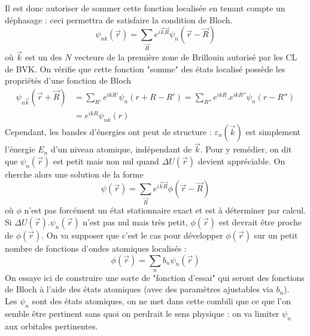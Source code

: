 Il est donc autoriser de sommer cette fonction localisée en tenant compte un 
déphasage : ceci permettra de satisfaire la condition de Bloch. 
\begin{equation}
\psi_{nk}(\vec{r}) = \sum_{\vec{R}} e^{i\vec{k}\vec{R}}\psi_n(\vec{r}-\vec{R})
\end{equation}
où $\vec{k}$ est un des $N$ vecteurs de la première zone de Brillouin autorisé 
par les CL de BVK. On vérifie que cette fonction "somme" des états localisé 
possède les propriétés d'une fonction de  Bloch
\begin{equation}
\begin{array}{ll}
\psi_{n\vec{k}}(\vec{r}+\vec{R}) &= \sum_{R'} e^{ikR'}\psi_n(r+R-R') = \sum_{R''} 
e^{ikR}.e^{ikR''}\psi_n(r-R'')\\
&= e^{ikR}\psi_{nk}(r)
\end{array}
\end{equation}
Cependant, les bandes d'énergies ont peut de structure : $\varepsilon_n(\vec{k})$ 
est simplement l'énergie $E_n$ d'un niveau atomique, indépendant de $\vec{k}$. Pour 
y remédier, on dit que $\psi_n(\vec{r})$ est petit mais non nul quand $\Delta 
U(\vec{r})$ devient appréciable. On cherche alors une solution de la forme
\begin{equation}
\psi(\vec{r}) = \sum_{\vec{R}} e^{i\vec{k}\vec{R}}\phi(\vec{r}-\vec{R})
\end{equation}
où $\phi$ n'est pas forcément un état stationnaire exact et est à déterminer par
calcul. Si $\Delta U(\vec{r}).\psi_n(\vec{r})$ n'est pas nul mais très petit, 
$\phi(\vec{r})$ est devrait être proche de $\phi(\vec{r})$. On va supposer que 
c'est le cas pour développer $\phi(\vec{r})$ sur un petit nombre de fonctions 
d'ondes atomiques localisés :
\begin{equation}
\phi(\vec{r}) = \sum_n b_n\psi_n(\vec{r})
\end{equation}
On essaye ici de construire une sorte de "fonction d'essai" qui seront des 
fonctions de Bloch à l'aide des états atomiques (avec des paramètres 
ajustables via $b_n$).\\
\danger Les  $\psi_n$ sont des états atomiques, on ne met dans cette combili 
que ce que l'on semble être pertinent sans quoi on perdrait le sens physique : 
on va limiter $\psi_n$ aux orbitales pertinentes.\\

